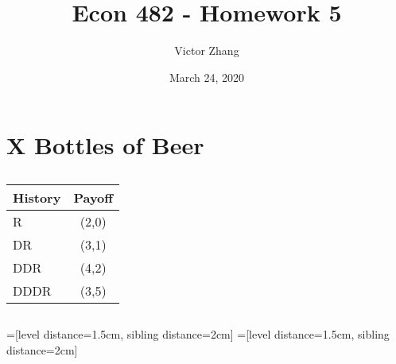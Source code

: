 \documentclass{article}
\title{Econ 482 - Homework 5}
\author{Victor Zhang}
\date{March 24, 2020}
\begin{document}
\maketitle

\section{X Bottles of Beer}
\subsection{}
\begin{tabular}{ l | c }
History & Payoff\\
\hline
    R & (2,0)\\
    DR & (3,1)\\
    DDR & (4,2)\\
    DDDR & (3,5)\\
\end{tabular}

\subsection{}
=[level distance=1.5cm, sibling distance=2cm]
=[level distance=1.5cm, sibling distance=2cm]
\end{document}

